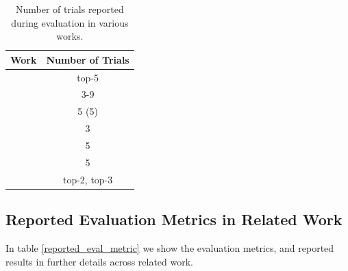 \begin{table}[H]
    \centering
    \begin{tabular}{c|c}
         \hline
         Work & Number of Trials \\
         \hline
         \cite{mnih2016asynchronous}& top-5\\
         \cite{PPO} & 3-9 \\
         \cite{rllab} & 5 (5)\\
         \cite{IPG} & 3\\
         \cite{DDPG} & 5\\
         \cite{TRPO} & 5\\
         \cite{ACKTR} & top-2, top-3\\
         \hline
    \end{tabular}
    \caption{Number of trials reported during evaluation in various works.}
    \label{tab:trials}
\end{table}

\subsection{Reported Evaluation Metrics in Related Work}

In table \ref{reported_eval_metric} we show the evaluation metrics, and reported results in further details across related work.


